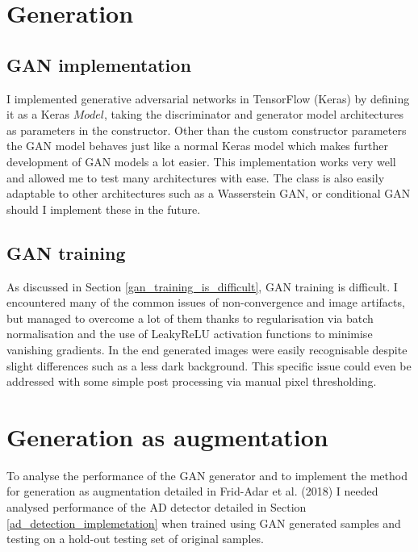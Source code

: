 \documentclass[
    author={Kai Hulme},
    supervisor={Dr Jon Bird},
    degree={BSc},
    title={Generative Adversarial Networks as an Augmentation Technique},
    subtitle={for Alzheimer's Disease Detection in MRI Volumes},
    type={Research},
    year={2021} 
]{dissertation}
\begin{document}

\section{Generation}

\subsection{GAN implementation}

I implemented generative adversarial networks in TensorFlow (Keras) by defining it as a Keras $Model$, taking the discriminator and generator model architectures as parameters in the constructor. Other than the custom constructor parameters the GAN model behaves just like a normal Keras model which makes further development of GAN models a lot easier. This implementation works very well and allowed me to test many architectures with ease. The class is also easily adaptable to other architectures such as a Wasserstein GAN, or conditional GAN should I implement these in the future.

\subsection{GAN training}

As discussed in Section \ref{gan_training_is_difficult}, GAN training is difficult. I encountered many of the common issues of non-convergence and image artifacts, but managed to overcome a lot of them thanks to regularisation via batch normalisation and the use of LeakyReLU activation functions to minimise vanishing gradients. In the end generated images were easily recognisable despite slight differences such as a less dark background. This specific issue could even be addressed with some simple post processing via manual pixel thresholding. \\

				
\section{Generation as augmentation}

To analyse the performance of the GAN generator and to implement the method for generation as augmentation detailed in Frid-Adar et al. (2018) \cite{frid2018gan} I needed analysed performance of the AD detector detailed in Section \ref{ad_detection_implemetation} when trained using GAN generated samples and testing on a hold-out testing set of original samples. 
\end{document}

